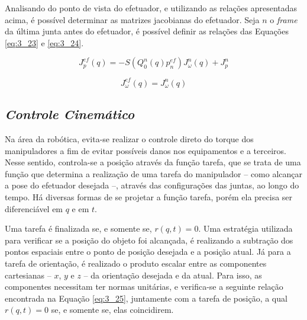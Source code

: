 Analisando do ponto de vista do efetuador, e utilizando as relações apresentadas acima, é possível determinar as matrizes jacobianas do efetuador. Seja $n$ o \textit{frame} da última junta antes do efetuador, é possível definir as relações das Equações \ref{eq:3_23} e \ref{eq:3_24}.

\begin{equation}
J^{ef}_p(q) = -S(Q^n_0(q)p^{ef}_n)J^n_{\omega}(q) + J^n_p
\label{eq:3_23}
\end{equation}

\begin{equation}
J^{ef}_{\omega}(q) = J^n_{\omega}(q)
\label{eq:3_24}
\end{equation}




 
\subsection{\textit{Controle Cinemático}}\label{sec:Cap3_ControleCin}

Na área da robótica, evita-se realizar o controle direto do torque dos manipuladores a fim de evitar possíveis danos nos equipamentos e a terceiros. Nesse sentido, controla-se a posição através da função tarefa, que se trata de uma função que determina a realização de uma tarefa do manipulador – como alcançar a pose do efetuador desejada –, através das configurações das juntas, ao longo do tempo. Há diversas formas de se projetar a função tarefa, porém ela precisa ser diferenciável em $q$ e em $t$.

Uma tarefa é finalizada se, e somente se, $r(q,t) = 0$. Uma estratégia utilizada para verificar se a posição do objeto foi alcançada, é realizando a subtração dos pontos espaciais entre o ponto de posição desejada e a posição atual. Já para a tarefa de orientação, é realizado o produto escalar entre as componentes cartesianas – $x$, $y$ e $z$ – da orientação desejada e da atual. Para isso, as componentes necessitam ter normas unitárias, e verifica-se a seguinte relação encontrada na Equação \ref{eq:3_25}, juntamente com a tarefa de posição, a qual $r(q,t) = 0$ se, e somente se, elas coincidirem.

